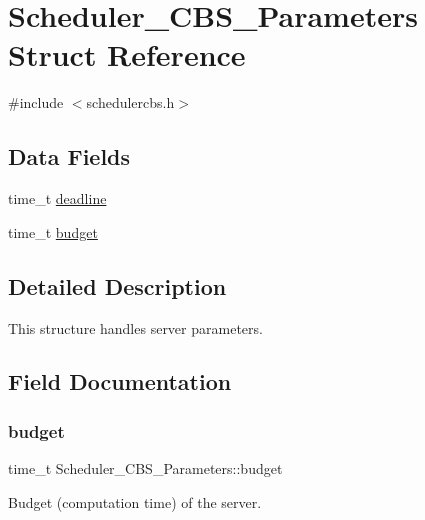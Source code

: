 \hypertarget{structScheduler__CBS__Parameters}{}\section{Scheduler\+\_\+\+C\+B\+S\+\_\+\+Parameters Struct Reference}
\label{structScheduler__CBS__Parameters}


{\ttfamily \#include $<$schedulercbs.\+h$>$}

\subsection*{Data Fields}
\begin{DoxyCompactItemize}
\item 
time\+\_\+t \mbox{\hyperlink{structScheduler__CBS__Parameters_a2d78217aecff29f64d7fa2e374a30825}{deadline}}
\item 
time\+\_\+t \mbox{\hyperlink{structScheduler__CBS__Parameters_a6a5a7162cc422b3eed90a49a30b33c23}{budget}}
\end{DoxyCompactItemize}


\subsection{Detailed Description}
This structure handles server parameters. 

\subsection{Field Documentation}
\mbox{\label{structScheduler__CBS__Parameters_a6a5a7162cc422b3eed90a49a30b33c23}} 
\subsubsection{\texorpdfstring{budget}{budget}}
{\footnotesize\ttfamily time\+\_\+t Scheduler\+\_\+\+C\+B\+S\+\_\+\+Parameters\+::budget}

Budget (computation time) of the server. \mbox{\label{structScheduler__CBS__Parameters_a2d78217aecff29f64d7fa2e374a30825}} 
